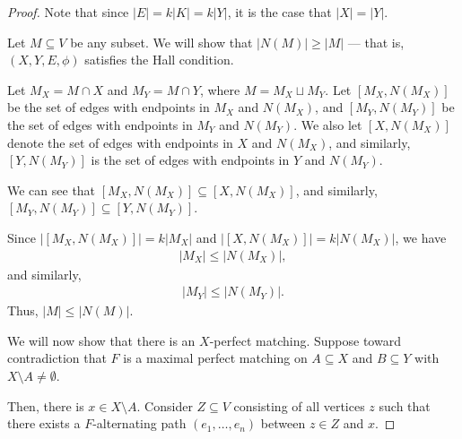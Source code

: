 \documentclass[10pt]{mypackage2}
\begin{document}
\begin{proof}
  Note that since $\left\vert E \right\vert = k\left\vert K \right\vert = k\left\vert Y \right\vert$, it is the case that $\left\vert X \right\vert = \left\vert Y \right\vert$.\newline

  Let $M\subseteq V$ be any subset. We will show that $\left\vert N(M) \right\vert\geq \left\vert M \right\vert$ --- that is, $\left(X,Y,E,\phi\right)$ satisfies the Hall condition.\newline

  Let $M_X = M\cap X$ and $M_Y = M\cap Y$, where $M = M_X\sqcup M_Y$. Let $\left[M_X,N\left(M_X\right)\right]$ be the set of edges with endpoints in $M_X$ and $N\left(M_X\right)$, and $\left[M_Y,N\left(M_Y\right)\right]$ be the set of edges with endpoints in $M_Y$ and $N\left(M_Y\right)$. We also let $\left[X,N\left(M_X\right)\right]$ denote the set of edges with endpoints in $X$ and $N\left(M_X\right)$, and similarly, $\left[Y,N\left(M_Y\right)\right]$ is the set of edges with endpoints in $Y$ and $N\left(M_Y\right)$.\newline

  We can see that $\left[M_X,N\left(M_X\right)\right]\subseteq \left[X,N\left(M_X\right)\right]$, and similarly, $\left[M_Y,N\left(M_Y\right)\right]\subseteq \left[Y,N\left(M_Y\right)\right]$.\newline

  Since $\left\vert \left[M_X,N\left(M_X\right)\right] \right\vert = k\left\vert M_X \right\vert$ and $\left\vert \left[X,N\left(M_X\right)\right] \right\vert = k\left\vert N\left(M_X\right) \right\vert$, we have
  \begin{align*}
    \left\vert M_X \right\vert\leq \left\vert N\left(M_X\right) \right\vert,
  \end{align*}
  and similarly,
  \begin{align*}
    \left\vert M_Y \right\vert\leq \left\vert N\left(M_Y\right) \right\vert.
  \end{align*}
  Thus, $\left\vert M \right\vert\leq \left\vert N\left(M\right) \right\vert$.\newline

  We will now show that there is an $X$-perfect matching. Suppose toward contradiction that $F$ is a maximal perfect matching on $A\subseteq X$ and $B\subseteq Y$ with $X\setminus A \neq \emptyset$.\newline

  Then, there is $x\in X\setminus A$. Consider $Z\subseteq V$ consisting of all vertices $z$ such that there exists a $F$-alternating path $\left(e_1,\dots,e_n\right)$ between $z\in Z$ and $x$.\newline


\end{proof}
\end{document}
